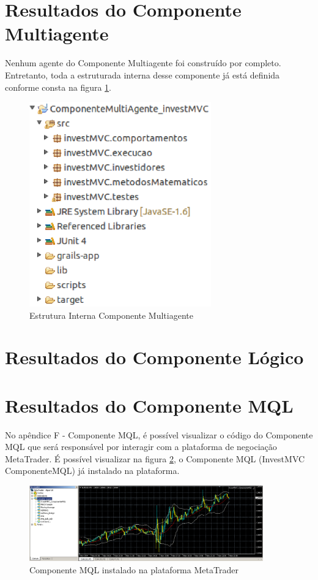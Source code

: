 \section{Resultados do Componente Multiagente}

Nenhum agente do Componente Multiagente foi construído por completo. Entretanto, toda a estruturada interna desse componente já está definida conforme consta na figura \ref{estruturaSMA}.

\begin{figure}[H]
\centering
\includegraphics[width=0.7\textwidth]{figuras/estruturaSMA}
\caption{ Estrutura Interna Componente Multiagente}
\label{estruturaSMA}
\end{figure}

\section{Resultados do Componente Lógico}
\section{Resultados do Componente MQL}

No apêndice F - Componente MQL, é possível visualizar o código do Componente MQL que será responsável por interagir com a plataforma de negociação MetaTrader. É possível visualizar na figura \ref{componenteMQL}, o Componente MQL  (InvestMVC ComponenteMQL) já instalado na plataforma.

\begin{figure}[H]
\centering
\includegraphics[width=0.9\textwidth]{figuras/componenteMQL}
\caption{Componente MQL instalado na plataforma MetaTrader}
\label{componenteMQL}
\end{figure}